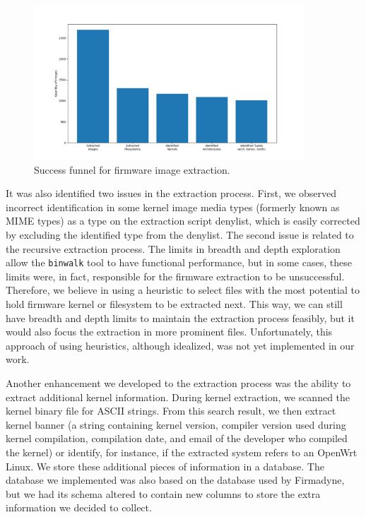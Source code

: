 \documentclass[12pt]{article}
\begin{document}
\begin{figure}[h]
    \centering
    \includegraphics[width=0.90\textwidth]{figs/Funnel.png}
    \caption{Success funnel for firmware image extraction.}
    \label{fig:stats-funnel}
\end{figure}

It was also identified two issues in the extraction process. First, we observed incorrect identification in some kernel image media types (formerly known as MIME types) as a type on the extraction script denylist, which is easily corrected by excluding the identified type from the denylist. The second issue is related to the recursive extraction process. The limits in breadth and depth exploration allow the {\tt binwalk} tool to have functional performance, but in some cases, these limits were, in fact, responsible for the firmware extraction to be unsuccessful. Therefore, we believe in using a heuristic to select files with the most potential to hold firmware kernel or filesystem to be extracted next. This way, we can still have breadth and depth limits to maintain the extraction process feasibly, but it would also focus the extraction in more prominent files. Unfortunately, this approach of using heuristics, although idealized, was not yet implemented in our work.

Another enhancement we developed to the extraction process was the ability to extract additional kernel information. During kernel extraction, we scanned the kernel binary file for ASCII strings. From this search result, we then extract kernel banner (a string containing kernel version, compiler version used during kernel compilation, compilation date, and email of the developer who compiled the kernel) or identify, for instance, if the extracted system refers to an OpenWrt Linux. We store these additional pieces of information in a database. The database we implemented was also based on the database used by Firmadyne, but we had its schema altered to contain new columns to store the extra information we decided to collect.
\end{document}
